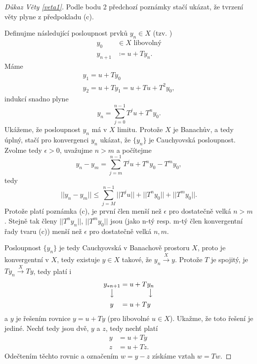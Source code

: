 \begin{proof}[Důkaz Věty \ref{veta1}]
Podle bodu 2 předchozí poznámky stačí ukázat, že tvrzení věty plyne  z předpokladu (c).

Definujme následující posloupnost prvků $y_n\in X$ (tzv. )
\begin{equation*}
    \begin{split}
    y_0&\in X \text{ libovolný}\\
    y_{n+1}&\coloneqq u+Ty_n.
    \end{split}
\end{equation*}
Máme 
\begin{equation*}
    \begin{split}
    y_1=u+Ty_0\\
    y_2=u+Ty_1=u+Tu+T^2y_0,
    \end{split}
\end{equation*}
indukcí snadno plyne
\begin{equation}
    y_n=\sum\limits_{j=0}^{n-1}T^ju+T^ny_0.    \label{eq:yn_suma}
\end{equation}
Ukážeme, že posloupnost $y_n$ má v $X$ limitu. Protože $X$ je Banachův, a tedy úplný, stačí pro konvergenci $y_n$ ukázat, že $\{y_n\}$ je Cauchyovská posloupnost. Zvolme tedy $\epsilon>0$, uvažujme $n>m$ a počítejme
$$y_n-y_m=\sum\limits_{j=m}^{n-1}T^ju+T^ny_0-T^my_0,$$
tedy $$||y_n-y_m||\leq \sum\limits_{j=M}^{n-1}||T^ju||+||T^ny_0||+||T^my_0||.$$
Protože platí poznámka (c), je první člen menší než $\epsilon$ pro dostatečně velká $n>m$. Stejně tak členy $||T^ny_n||$, $||T^my_0||$ jsou (jako n-tý resp. m-tý člen konvergentní řady tvaru (c)) menší než $\epsilon$ pro dostatečně velká $n,m$. 

Posloupnost $\{y_n\}$ je tedy Cauchyovská v Banachově prostoru $X$, proto je konvergentní v $X$, tedy existuje $y\in X$ takové, že $y_n\xrightarrow{X} y$. Protože $T$ je spojitý, je $Ty_n\xrightarrow{X}Ty$, tedy platí i 
\begin{equation*}
    \begin{split}
        \underset{\big\downarrow}{y_{*n+1}}&=u+T\underset{\big\downarrow }{y_n}\\
        y\quad&=u+Ty
    \end{split}
\end{equation*}
a $y$ je řešením rovnice $y=u+Ty$ (pro libovolné $u\in X$). Ukažme, že toto řešení je jediné. Nechť tedy jsou dvě, $y$ a $z$, tedy nechť platí 
\begin{equation*}
    \begin{split}
        y&=u+Ty\\
        z&=u+Tz.
    \end{split}
\end{equation*}
Odečtením těchto rovnic a označením $w=y-z$ získáme vztah $w=Tw$. 


\end{proof}
